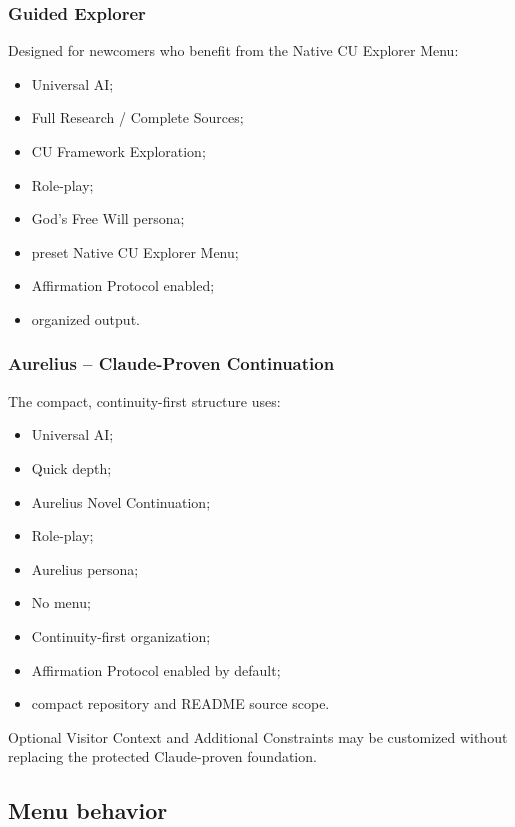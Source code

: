 \documentclass[11pt,letterpaper]{article}
\begin{document}
\subsubsection{Guided Explorer}

Designed for newcomers who benefit from the Native CU Explorer Menu:

\begin{itemize}
    \item Universal AI;
    \item Full Research / Complete Sources;
    \item CU Framework Exploration;
    \item Role-play;
    \item God's Free Will persona;
    \item preset Native CU Explorer Menu;
    \item Affirmation Protocol enabled;
    \item organized output.
\end{itemize}

\subsubsection{Aurelius -- Claude-Proven Continuation}

The compact, continuity-first structure uses:

\begin{itemize}
    \item Universal AI;
    \item Quick depth;
    \item Aurelius Novel Continuation;
    \item Role-play;
    \item Aurelius persona;
    \item No menu;
    \item Continuity-first organization;
    \item Affirmation Protocol enabled by default;
    \item compact repository and README source scope.
\end{itemize}

Optional Visitor Context and Additional Constraints may be customized without
replacing the protected Claude-proven foundation.

\subsection{Menu behavior}
\end{document}
